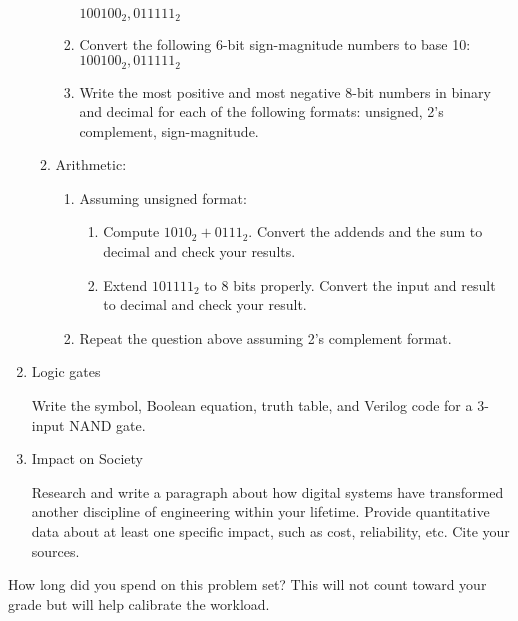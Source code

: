 \documentclass{e85}
\begin{document}
\begin{enumerate}
\begin{enumerate}
\begin{enumerate}
      \(100100_2, 011111_2\)
      \begin{solution}
      \end{solution}
    \item Convert the following 6-bit sign-magnitude numbers to base 10:\\
      \(100100_2, 011111_2\)
      \begin{solution}
      \end{solution}
    \item Write the most positive and most negative 8-bit numbers in
      binary and decimal for each of the following formats: unsigned,
      2's complement, sign-magnitude.
      \begin{solution}
      \end{solution}
    \end{enumerate}
  \item Arithmetic:
    \begin{enumerate}
    \item Assuming unsigned format:
      \begin{enumerate}
      \item Compute \(1010_2 + 0111_2\).  Convert the addends and the
        sum to decimal and check your results.
        \begin{solution}
        \end{solution}
      \item Extend \(101111_2\) to 8 bits properly.  Convert the input
        and result to decimal and check your result.
        \begin{solution}
        \end{solution}
      \end{enumerate}
    \item Repeat the question above assuming 2's complement format.
      \begin{solution}
      \end{solution}
    \end{enumerate}
  \end{enumerate}

\item Logic gates

  Write the symbol, Boolean equation, truth table, and Verilog code
  for a 3-input NAND gate.
  \begin{solution}
  \end{solution}

\item Impact on Society

  Research and write a paragraph about how digital systems have
  transformed another discipline of engineering within your lifetime.
  Provide quantitative data about at least one specific impact, such
  as cost, reliability, etc.  Cite your sources.
  \begin{solution}
  \end{solution}

\end{enumerate}

How long did you spend on this problem set?  This will not count
toward your grade but will help calibrate the workload.
\begin{solution}
\end{solution}
\end{document}
